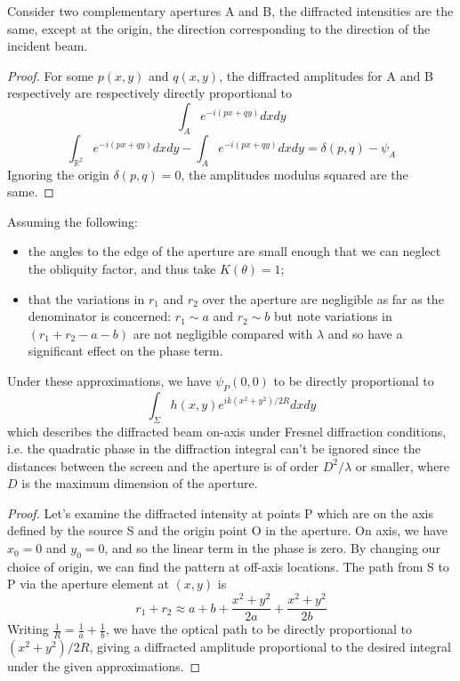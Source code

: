 \documentclass[a4paper]{article}
\begin{document}
\begin{thm}
Consider two complementary apertures A and B, the diffracted intensities are the same, except at the origin, the direction corresponding to the direction of the incident beam.
\end{thm}
\begin{proof}
For some $p(x,y)$ and $q(x,y)$, the diffracted amplitudes for A and B respectively are respectively directly proportional to  $$\int_Ae^{-i(px+qy)}dxdy$$ 
$$\int_{\mathbb{R}^2}e^{-i(px+qy)}dxdy-\int_Ae^{-i(px+qy)}dxdy=\delta(p,q)-\psi_A$$
Ignoring the origin $\delta(p,q)=0$, the amplitudes modulus squared are the same.
\end{proof}
\begin{thm}
Assuming the following:
\begin{itemize}
    \item the angles to the edge of the aperture are small enough that we can neglect the obliquity factor, and thus take $K(\theta)=1$;
    \item that the variations in $r_1$ and $r_2$ over the aperture are negligible as far as the denominator is concerned: $r_1\sim a$ and $r_2\sim b$ but note variations in $(r_1+r_2-a-b)$ are not negligible compared with $\lambda$ and so have a significant effect on the phase term.
\end{itemize}
Under these approximations, we have $\psi_P(0,0)$ to be directly proportional to
$$\int_\Sigma h(x,y)e^{ik(x^2+y^2)/2R}dxdy$$
which describes the diffracted beam on-axis under Fresnel diffraction conditions, i.e. the quadratic phase in the diffraction integral can't be ignored since the distances between the screen and the aperture is of order $D^2/\lambda$ or smaller, where $D$ is the maximum dimension of the aperture.
\end{thm}
\begin{proof}
Let's examine the diffracted intensity at points P which are on the axis defined by the source S and the origin point O in the aperture. On axis, we have $x_0=0$ and $y_0=0$, and so the linear term in the phase is zero. By changing our choice of origin, we can find the pattern at off-axis locations. The path from S to P via the aperture element at $(x,y)$ is
$$r_1+r_2\approx a+b+\frac{x^2+y^2}{2a}+\frac{x^2+y^2}{2b}$$
Writing $\frac{1}{R}=\frac{1}{a}+\frac{1}{b}$, we have the optical path to be directly proportional to $(x^2+y^2)/2R$, giving a diffracted amplitude proportional to the desired integral under the given approximations.
\end{proof}
\end{document}
